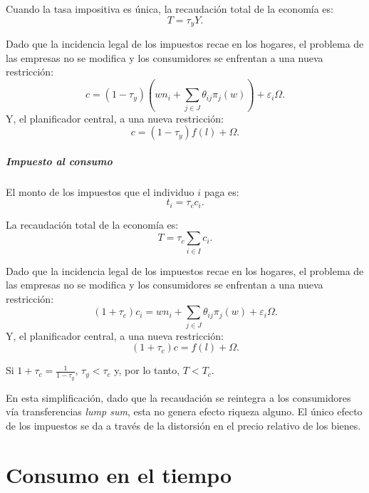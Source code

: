 \documentclass[8pt,a4paper]{extarticle}
\begin{document}
\begin{multicols}{3}
\begin{boxprop}[]
	Cuando la tasa impositiva es única, la recaudación total de la economía es:
	\[
	T = \tau_y Y
	.\] 
\end{boxprop}

\begin{boxrmk}[]
	Dado que la incidencia legal de los impuestos recae en los hogares, el problema de las empresas no se modifica y los consumidores se enfrentan a una nueva restricción:
	\[
		c = (1 - \tau_y) \left( wn_i + \sum_{j \in J} \theta_{ij} \pi_j(w) \right) + \varepsilon_i\Omega
	.\]
	Y, el planificador central, a una nueva restricción:
	\[
		c = (1 - \tau_y) f(l) + \Omega
	.\] 
\end{boxrmk}

\subsubsection{Impuesto al consumo}

El monto de los impuestos que el individuo $i$ paga es:
\[
t_i = \tau_c c_i
.\] 

\begin{boxprop}[]
	La recaudación total de la economía es:
	\[
	T = \tau_c \sum_{i \in I} c_i
	.\] 
\end{boxprop}

\begin{boxrmk}[]
	Dado que la incidencia legal de los impuestos recae en los hogares, el problema de las empresas no se modifica y los consumidores se enfrentan a una nueva restricción:
	\[
		(1 + \tau_c)c_i = wn_i + \sum_{j \in J} \theta_{ij}\pi_j(w) + \varepsilon_i\Omega
	.\] 
	Y, el planificador central, a una nueva restricción:
	\[
		(1 + \tau_c) c = f(l) + \Omega
	.\] 
\end{boxrmk}

\begin{boxprop}[]
	Si $\displaystyle 1 + \tau_c = \frac{1}{1 - \tau_y}$, $\tau_y < \tau_c$ y, por lo tanto, $T < T_c$.
\end{boxprop}

\begin{boxrmk}[]
	En esta simplificación, dado que la recaudación se reintegra a los consumidores vía transferencias \emph{lump sum}, esta no genera efecto riqueza alguno. El único efecto de los impuestos se da a través de la distorsión en el precio relativo de los bienes.
\end{boxrmk}

\newpage

\part{Consumo en el tiempo}


\end{multicols}
\end{document}
